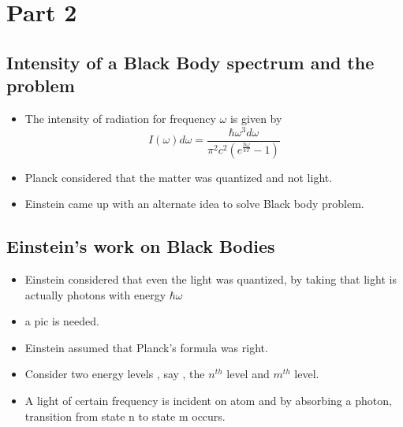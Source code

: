 \documentclass[aspectratio=169]{beamer}
\begin{document}
\section{Part 2}

\subsection{Intensity of a Black Body spectrum and the problem}

\begin{frame}{}
	\begin{itemize}

		\item The intensity of radiation for frequency $\omega$ is given by \[I(\omega)d\omega = \frac{\hbar \omega^3 d\omega}{ \pi^2 c^2 \left(e^{\frac{\hbar \omega}{kT}}-1 \right) } \] \newline
		\item Planck considered that the matter was quantized and not light. \newline
		\item Einstein came up with an alternate idea to solve Black body problem. \newline  
	\end{itemize}
\end{frame}

\subsection{Einstein's work on Black Bodies}

\begin{frame}{}
	\begin{itemize}

		\item Einstein considered that even the light was quantized, by taking that light is actually photons with energy $\hbar \omega$   \newline
		\item a pic is needed. \newline

	\end{itemize}
\end{frame}

\begin{frame}{}
	\begin{itemize}
		\item Einstein assumed that Planck's formula was right. \newline
		\item Consider two energy levels , say , the $n^{th}$ level and $m^{th}$ level. \newline
		\item A light of certain frequency is incident on atom and by absorbing a photon, transition from state n to state m occurs. 
 
	\end{itemize}
\end{frame}
\end{document}
